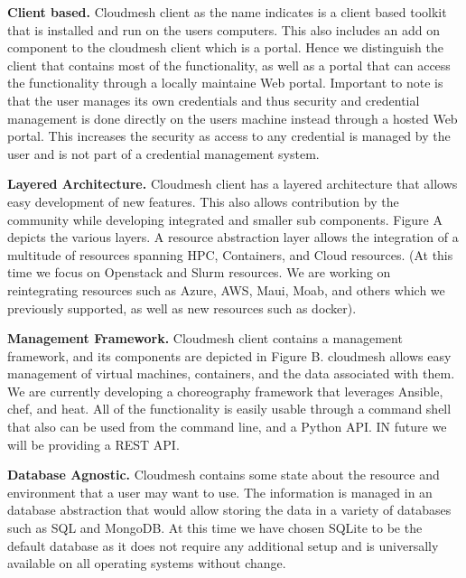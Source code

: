 \begin{description}

\item{\bf Client based.} Cloudmesh client as the name indicates is a
client based toolkit that is installed and run on the users
computers. This also includes an add on component to the cloudmesh
client which is a portal. Hence we distinguish the client that
contains most of the functionality, as well as a portal that can
access the functionality through a locally maintaine Web
portal. Important to note is that the user manages its own credentials
and thus security and credential management is done directly on the
users machine instead through a hosted Web portal. This increases the
security as access to any credential is managed by the user and is not
part of a credential management system.

\item{\bf Layered Architecture.} Cloudmesh client has a layered
architecture that allows easy development of new features. This also
allows contribution by the community while developing integrated and
smaller sub components. Figure A depicts the various layers. A
resource abstraction layer allows the integration of a multitude of
resources spanning HPC, Containers, and Cloud resources. (At this time
we focus on Openstack and Slurm resources. We are working on
reintegrating resources such as Azure, AWS, Maui, Moab, and others
which we previously supported, as well as new resources such as
docker).

\item{\bf Management Framework.} Cloudmesh client contains a
management framework, and its components are depicted in Figure
B. cloudmesh allows easy management of virtual machines, containers,
and the data associated with them. We are currently developing a
choreography framework that leverages Ansible, chef, and heat. All of
the functionality is easily usable through a command shell that also
can be used from the command line, and a Python API. IN future we will
be providing a REST API.

\item{\bf Database Agnostic.} Cloudmesh contains some state about the
resource and environment that a user may want to use. The information
is managed in an database abstraction that would allow storing the
data in a variety of databases such as SQL and MongoDB. At this time
we have chosen SQLite to be the default database as it does not
require any additional setup and is universally available on all
operating systems without change.


\end{description}
